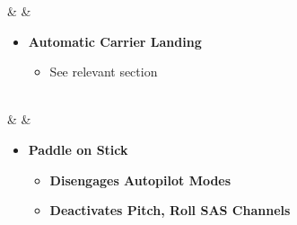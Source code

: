 \documentclass[fontInter]{TechCheck}
\begin{document}
\begin{listlongtable}
		\midrule
		\textbf{\textbullet} &  &
		\begin{minipage}[t]{\linewidth}
			\vspace{-7pt}
			\begin{itemize}
				\item \textbf{Automatic Carrier Landing}
				\begin{itemize}
					\item See relevant section
				\end{itemize}
			\end{itemize}
		\end{minipage} \\
		\midrule
		\textbf{\textbullet} &  &
		\begin{minipage}[t]{\linewidth}
			\vspace{-7pt}
			\begin{itemize}
				\item \textbf{Paddle on Stick}
				\begin{itemize}
					\item \textbf{Disengages Autopilot Modes}
					\item \textbf{Deactivates Pitch, Roll SAS Channels}
				\end{itemize}
			\end{itemize}
		\end{minipage} \\
	\end{listlongtable}
\end{document}
